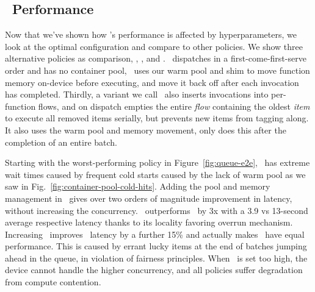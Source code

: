 \subsection{\QName~Performance}
\label{sec:queue-perf}

Now that we've shown how \QName's performance is affected by hyperparameters, we look at the optimal configuration and compare to other policies.
We show three alternative policies as comparison, \naive, \fcfs, and \batch.
\naive~dispatches in a first-come-first-serve order and has no container pool, \fcfs~uses our warm pool and shim to move function memory on-device before executing, and move it back off after each invocation has completed.
Thirdly, a variant we call \batch~also inserts invocations into per-function flows, and on dispatch empties the entire \emph{flow} containing the oldest \emph{item} to execute all removed items serially, but prevents new items from tagging along.
It also uses the warm pool and memory movement, only does this after the completion of an entire batch.

Starting with the worst-performing policy in Figure~\ref{fig:queue-e2e}, \naive~has extreme wait times caused by frequent cold starts caused by the lack of warm pool as we saw in Fig.~\ref{fig:container-pool-cold-hits}.
Adding the pool and memory management in \fcfs~gives over two orders of magnitude improvement in latency, without increasing the concurrency.
\QName~outperforms \fcfs~by 3x with a 3.9 vs 13-second average respective latency thanks to its locality favoring overrun mechanism.
Increasing \D~improves \QName~latency by a further 15\% and actually makes \batch~have equal performance.
This is caused by errant lucky items at the end of batches jumping ahead in the queue, in violation of fairness principles.
When \D~is set too high, the device cannot handle the higher concurrency, and all policies suffer degradation from compute contention.


